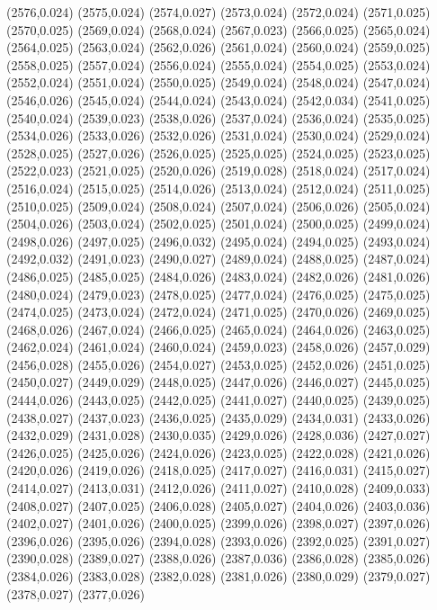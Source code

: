 (2576,0.024)
(2575,0.024)
(2574,0.027)
(2573,0.024)
(2572,0.024)
(2571,0.025)
(2570,0.025)
(2569,0.024)
(2568,0.024)
(2567,0.023)
(2566,0.025)
(2565,0.024)
(2564,0.025)
(2563,0.024)
(2562,0.026)
(2561,0.024)
(2560,0.024)
(2559,0.025)
(2558,0.025)
(2557,0.024)
(2556,0.024)
(2555,0.024)
(2554,0.025)
(2553,0.024)
(2552,0.024)
(2551,0.024)
(2550,0.025)
(2549,0.024)
(2548,0.024)
(2547,0.024)
(2546,0.026)
(2545,0.024)
(2544,0.024)
(2543,0.024)
(2542,0.034)
(2541,0.025)
(2540,0.024)
(2539,0.023)
(2538,0.026)
(2537,0.024)
(2536,0.024)
(2535,0.025)
(2534,0.026)
(2533,0.026)
(2532,0.026)
(2531,0.024)
(2530,0.024)
(2529,0.024)
(2528,0.025)
(2527,0.026)
(2526,0.025)
(2525,0.025)
(2524,0.025)
(2523,0.025)
(2522,0.023)
(2521,0.025)
(2520,0.026)
(2519,0.028)
(2518,0.024)
(2517,0.024)
(2516,0.024)
(2515,0.025)
(2514,0.026)
(2513,0.024)
(2512,0.024)
(2511,0.025)
(2510,0.025)
(2509,0.024)
(2508,0.024)
(2507,0.024)
(2506,0.026)
(2505,0.024)
(2504,0.026)
(2503,0.024)
(2502,0.025)
(2501,0.024)
(2500,0.025)
(2499,0.024)
(2498,0.026)
(2497,0.025)
(2496,0.032)
(2495,0.024)
(2494,0.025)
(2493,0.024)
(2492,0.032)
(2491,0.023)
(2490,0.027)
(2489,0.024)
(2488,0.025)
(2487,0.024)
(2486,0.025)
(2485,0.025)
(2484,0.026)
(2483,0.024)
(2482,0.026)
(2481,0.026)
(2480,0.024)
(2479,0.023)
(2478,0.025)
(2477,0.024)
(2476,0.025)
(2475,0.025)
(2474,0.025)
(2473,0.024)
(2472,0.024)
(2471,0.025)
(2470,0.026)
(2469,0.025)
(2468,0.026)
(2467,0.024)
(2466,0.025)
(2465,0.024)
(2464,0.026)
(2463,0.025)
(2462,0.024)
(2461,0.024)
(2460,0.024)
(2459,0.023)
(2458,0.026)
(2457,0.029)
(2456,0.028)
(2455,0.026)
(2454,0.027)
(2453,0.025)
(2452,0.026)
(2451,0.025)
(2450,0.027)
(2449,0.029)
(2448,0.025)
(2447,0.026)
(2446,0.027)
(2445,0.025)
(2444,0.026)
(2443,0.025)
(2442,0.025)
(2441,0.027)
(2440,0.025)
(2439,0.025)
(2438,0.027)
(2437,0.023)
(2436,0.025)
(2435,0.029)
(2434,0.031)
(2433,0.026)
(2432,0.029)
(2431,0.028)
(2430,0.035)
(2429,0.026)
(2428,0.036)
(2427,0.027)
(2426,0.025)
(2425,0.026)
(2424,0.026)
(2423,0.025)
(2422,0.028)
(2421,0.026)
(2420,0.026)
(2419,0.026)
(2418,0.025)
(2417,0.027)
(2416,0.031)
(2415,0.027)
(2414,0.027)
(2413,0.031)
(2412,0.026)
(2411,0.027)
(2410,0.028)
(2409,0.033)
(2408,0.027)
(2407,0.025)
(2406,0.028)
(2405,0.027)
(2404,0.026)
(2403,0.036)
(2402,0.027)
(2401,0.026)
(2400,0.025)
(2399,0.026)
(2398,0.027)
(2397,0.026)
(2396,0.026)
(2395,0.026)
(2394,0.028)
(2393,0.026)
(2392,0.025)
(2391,0.027)
(2390,0.028)
(2389,0.027)
(2388,0.026)
(2387,0.036)
(2386,0.028)
(2385,0.026)
(2384,0.026)
(2383,0.028)
(2382,0.028)
(2381,0.026)
(2380,0.029)
(2379,0.027)
(2378,0.027)
(2377,0.026)
